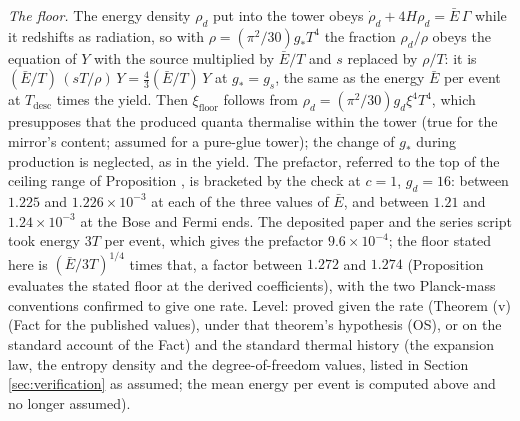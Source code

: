\emph{The floor.} The energy density $\rho_{d}$ put into the tower obeys $\dot{\rho}_{d} + 4H\rho_{d} = \bar{E}\,\Gamma$ while it redshifts as radiation, so with $\rho = (\pi^{2}/30)g_{*}T^{4}$ the fraction $\rho_{d}/\rho$ obeys the equation of $Y$ with the source multiplied by $\bar{E}/T$ and $s$ replaced by $\rho/T$: it is $(\bar{E}/T)\,(sT/\rho)\,Y = \tfrac43(\bar{E}/T)\,Y$ at $g_{*} = g_{s}$, the same as the energy $\bar{E}$ per event at $T_{\mathrm{desc}}$ times the yield. Then $\xi_{\mathrm{floor}}$ follows from $\rho_{d} = (\pi^{2}/30)g_{d}\xi^{4}T^{4}$, which presupposes that the produced quanta thermalise within the tower (true for the mirror's content; assumed for a pure-glue tower); the change of $g_{*}$ during production is neglected, as in the yield. The prefactor, referred to the top of the ceiling range of Proposition , is bracketed by the check at $c = 1$, $g_{d} = 16$: between $1.225$ and $1.226 \times 10^{-3}$ at each of the three values of $\bar{E}$, and between $1.21$ and $1.24 \times 10^{-3}$ at the Bose and Fermi ends. The deposited paper and the series script took energy $3T$ per event, which gives the prefactor $9.6 \times 10^{-4}$; the floor stated here is $(\bar{E}/3T)^{1/4}$ times that, a factor between $1.272$ and $1.274$ (Proposition  evaluates the stated floor at the derived coefficients), with the two Planck-mass conventions confirmed to give one rate. Level: proved given the rate (Theorem (v) (Fact  for the published values), under that theorem's hypothesis (OS), or on the standard account of the Fact) and the standard thermal history (the expansion law, the entropy density and the degree-of-freedom values, listed in Section \ref{sec:verification} as assumed; the mean energy per event is computed above and no longer assumed).
